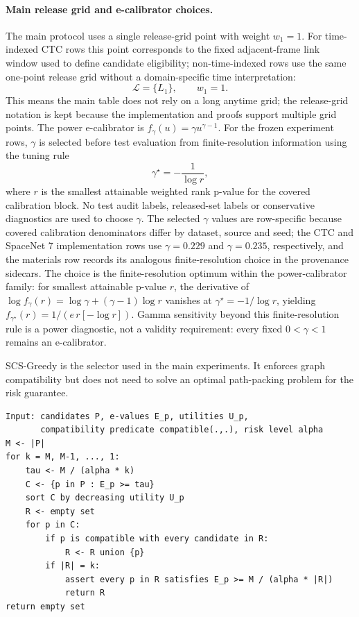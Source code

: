 \documentclass[11pt]{article}
\begin{document}
\paragraph{Main release grid and e-calibrator choices.}
The main protocol uses a single release-grid point with weight \(w_1=1\).
For time-indexed CTC rows this point corresponds to the fixed adjacent-frame link window used to define candidate eligibility; non-time-indexed rows use the same one-point release grid without a domain-specific time interpretation:
\[
\mathcal L=\{L_1\},\qquad w_1=1.
\]
This means the main table does not rely on a long anytime grid; the release-grid notation is kept because the implementation and proofs support multiple grid points.
The power e-calibrator is \(f_\gamma(u)=\gamma u^{\gamma-1}\).
For the frozen experiment rows, \(\gamma\) is selected before test evaluation from finite-resolution information using the tuning rule
\[
\gamma^\star=-\frac{1}{\log r},
\]
where \(r\) is the smallest attainable weighted rank p-value for the covered calibration block.
No test audit labels, released-set labels or conservative diagnostics are used to choose \(\gamma\).
The selected \(\gamma\) values are row-specific because covered calibration denominators differ by dataset, source and seed; the CTC and SpaceNet 7 implementation rows use \(\gamma=0.229\) and \(\gamma=0.235\), respectively, and the materials row records its analogous finite-resolution choice in the provenance sidecars.
The choice is the finite-resolution optimum within the power-calibrator family: for smallest attainable p-value \(r\), the derivative of \(\log f_\gamma(r)=\log\gamma+(\gamma-1)\log r\) vanishes at \(\gamma^\star=-1/\log r\), yielding \(f_{\gamma^\star}(r)=1/(e\,r[-\log r])\).
Gamma sensitivity beyond this finite-resolution rule is a power diagnostic, not a validity requirement: every fixed \(0<\gamma<1\) remains an e-calibrator.

SCS-Greedy is the selector used in the main experiments.
It enforces graph compatibility but does not need to solve an optimal path-packing problem for the risk guarantee.

\begin{verbatim}
Input: candidates P, e-values E_p, utilities U_p,
       compatibility predicate compatible(.,.), risk level alpha
M <- |P|
for k = M, M-1, ..., 1:
    tau <- M / (alpha * k)
    C <- {p in P : E_p >= tau}
    sort C by decreasing utility U_p
    R <- empty set
    for p in C:
        if p is compatible with every candidate in R:
            R <- R union {p}
        if |R| = k:
            assert every p in R satisfies E_p >= M / (alpha * |R|)
            return R
return empty set
\end{verbatim}
\end{document}
